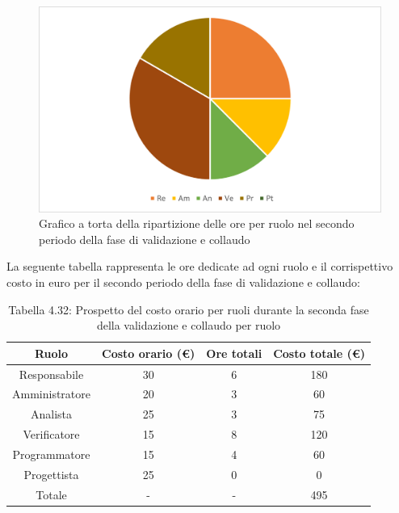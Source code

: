 \begin{figure}[H]
    \centering
    \includegraphics[scale=0.6]{img/grafi preventivo/torta/validazione/periodo2.png}
    \caption{Grafico a torta della ripartizione delle ore per ruolo nel secondo periodo della fase di validazione e collaudo}
\end{figure}
La seguente tabella rappresenta le ore dedicate ad ogni ruolo e il corrispettivo costo in euro per il secondo periodo della fase di validazione e collaudo:
\begin{table}[h]
	\setlength\extrarowheight{5pt}
	\centering
	\begin{tabularx}{\textwidth}{|ccc|c|}
		\hline
		\rowcolor{white}
		\textbf{Ruolo} & \textbf{Costo orario (€)} & \textbf{Ore totali} & \textbf{Costo totale (€)} \\
		\hline
		Responsabile &30&6&180 \\
		Amministratore &20&3&60 \\
		Analista &25&3&75 \\
		Verificatore &15&8&120 \\
		Programmatore &15&4&60 \\
		Progettista &25&0&0 \\
		\hline
		Totale &-&-&495 \\
		\hline
	\end{tabularx}
    \vspace{10pt}
	\caption{Tabella 4.32: Prospetto del costo orario per ruoli durante la seconda fase della validazione e collaudo per ruolo}
\end{table}
\newpage
